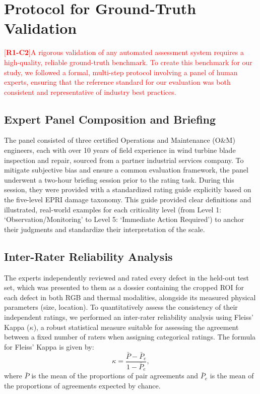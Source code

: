 \documentclass[energies,supfile,submit,pdftex,moreauthors]{Definitions/mdpi}
\newcommand{\revtag}[2]{[\textbf{R#1-C#2}]}
\newcommand{\Rone}[1]{\textcolor{red}{#1}}
\begin{document}
\section{Protocol for Ground-Truth Validation}\label{sec:ground_truth}
\Rone{\revtag{1}{2}A rigorous validation of any automated assessment system requires a high-quality, reliable ground-truth benchmark. To create this benchmark for our study, we followed a formal, multi-step protocol involving a panel of human experts, ensuring that the reference standard for our evaluation was both consistent and representative of industry best practices.}

\subsection{Expert Panel Composition and Briefing}
The panel consisted of three certified Operations and Maintenance (O\&M) engineers, each with over 10 years of field experience in wind turbine blade inspection and repair, sourced from a partner industrial services company. To mitigate subjective bias and ensure a common evaluation framework, the panel underwent a two-hour briefing session prior to the rating task. During this session, they were provided with a standardized rating guide explicitly based on the five-level EPRI damage taxonomy. This guide provided clear definitions and illustrated, real-world examples for each criticality level (from Level 1: `Observation/Monitoring' to Level 5: `Immediate Action Required') to anchor their judgments and standardize their interpretation of the scale.

\subsection{Inter-Rater Reliability Analysis}
The experts independently reviewed and rated every defect in the held-out test set, which was presented to them as a dossier containing the cropped ROI for each defect in both RGB and thermal modalities, alongside its measured physical parameters (size, location). To quantitatively assess the consistency of their independent ratings, we performed an inter-rater reliability analysis using Fleiss' Kappa (\(\kappa\)), a robust statistical measure suitable for assessing the agreement between a fixed number of raters when assigning categorical ratings. The formula for Fleiss' Kappa is given by:
\begin{equation}
    \kappa = \frac{\bar{P} - \bar{P}_e}{1 - \bar{P}_e},
\end{equation}
where \(\bar{P}\) is the mean of the proportions of pair agreements and \(\bar{P}_e\) is the mean of the proportions of agreements expected by chance.
\end{document}
